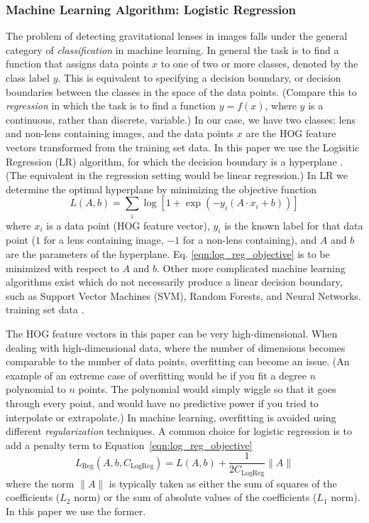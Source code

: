 \documentclass{emulateapj}
\begin{document}
\subsubsection{Machine Learning Algorithm: Logistic Regression}\label{sec:LR}
The problem of detecting gravitational lenses in images falls under
the general category of {\em{classification}} in machine learning. In
general the task is to find a function that assigns data points $x$ to
one of two or more classes, denoted by the class label $y$.  This is
equivalent to specifying a decision boundary, or decision boundaries
between the classes in the space of the data points.  (Compare this to
{\em{regression}} in which the task is to find a function $y=f(x)$,
where $y$ is a continuous, rather than discrete, variable.) In our
case, we have two classes: lens and non-lens containing images, and
the data points $x$ are the HOG feature vectors transformed from the
training set data.  In this paper we use the Logisitic Regression (LR)
algorithm, for which the decision boundary is a hyperplane .  (The
equivalent in the regression setting would be linear regression.) In
LR we determine the optimal hyperplane by minimizing the objective
function
\begin{equation}
\label{eqn:log_reg_objective}
L(A,b) = \sum_i \log \left[1 + \exp \left(-y_i (A \cdot x_i + b) \right) \right]
\end{equation}
where $x_i$ is a data point (HOG feature vector), $y_i$ is the
known label for that data point ($1$ for a lens containing
image, $-1$ for a non-lens containing), and $A$ and $b$ are
the parameters of the hyperplane. Eq. \ref{eqn:log_reg_objective}
is to be minimized with respect to $A$ and $b$.
Other more complicated machine learning algorithms exist which
do not necessarily produce a linear decision boundary, such as
Support Vector Machines (SVM), Random Forests, and Neural Networks.
training set data \citep{hastie_09}.

The HOG feature vectors in this paper can be very high-dimensional.
When dealing with high-dimensional data, where the number of
dimensions becomes comparable to the number of data points,
overfitting can become an issue. (An example of an extreme case
of overfitting would be if you fit a degree $n$ polynomial to $n$
points.  The polynomial would simply wiggle so that it goes
through every point, and would have no predictive power if you
tried to interpolate or extrapolate.) In machine learning,
overfitting is avoided using different {\em{regularization}}
techniques. A common choice for logistic regression is to
add a penalty term to Equation~\ref{eqn:log_reg_objective}
\begin{equation}\label{eqn:log_reg_regularized}
L_\text{Reg}(A,b,C_\text{LogReg}) = L(A,b) + \frac{1}{2C_\text{LogReg}} \|A\|
\end{equation}
where the norm $\|A\|$ is typically taken as either the
sum of squares of the coefficients ($L_2$ norm) or the sum
of absolute values of the coefficients ($L_1$ norm).  In this
paper we use the former.
\end{document}
